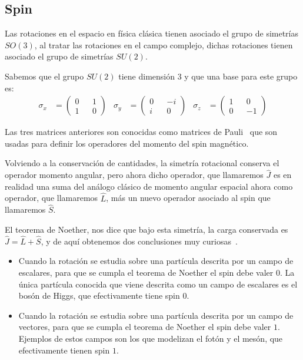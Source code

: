 \subsection{Spin}\label{subsec:spin}
Las rotaciones en el espacio en física clásica tienen asociado el grupo de simetrías $SO(3)$, al tratar las rotaciones en el campo complejo, dichas rotaciones tienen asociado el grupo de simetrías $SU(2)$.

Sabemos que el grupo $SU(2)$ tiene dimensión $3$ y que una base para este grupo es:
\begin{align}
	\sigma_x & = \begin{pmatrix} 0 && 1 \\ 1 && 0 \end{pmatrix} &
	\sigma_y & = \begin{pmatrix} 0 && -i \\ i && 0 \end{pmatrix} &
	\sigma_z & = \begin{pmatrix} 1 && 0 \\ 0 && -1 \end{pmatrix}
\end{align}

Las tres matrices anteriores son conocidas como matrices de Pauli~\autocite[50]{IQC} que son usadas para definir los operadores del momento del spin magnético.

Volviendo a la conservación de cantidades, la simetría rotacional conserva el operador momento angular, pero ahora dicho operador, que llamaremos $\hat{J}$ es en realidad una suma del análogo clásico de momento angular espacial ahora como operador, que llamaremos $\hat{L}$, más un nuevo operador asociado al spin que llamaremos $\hat{S}$.

El teorema de Noether, nos dice que bajo esta simetría, la carga conservada es $\hat{J}=\hat{L}+\hat{S}$, y de aquí obtenemos dos conclusiones muy curiosas~\autocite[45]{QMS}.
\begin{itemize}
	\item Cuando la rotación se estudia sobre una partícula descrita por un campo de escalares, para que se cumpla el teorema de Noether el spin debe valer $0$. La única partícula conocida que viene descrita como un campo de escalares es el bosón de Higgs, que efectivamente tiene spin $0$.
	\item Cuando la rotación se estudia sobre una partícula descrita por un campo de vectores, para que se cumpla el teorema de Noether el spin debe valer $1$. Ejemplos de estos campos son los que modelizan el fotón y el mesón, que efectivamente tienen spin $1$.
\end{itemize}


